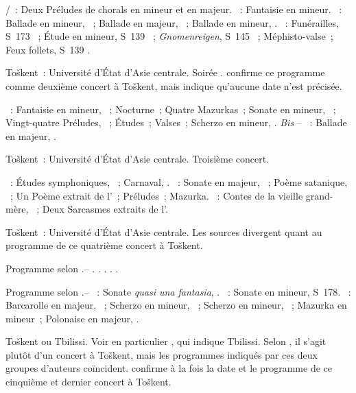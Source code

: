 \begin{description}
 \textsc{\JBach{}/\Busoni{}}~: Deux Préludes de chorals en \kG mineur et en
 \kG majeur.
 \textsc{\Mozart{}}~: Fantaisie en \kC mineur.
 \textsc{\Chopin{}}~: Ballade en \kF mineur, ~; Ballade en \kA
 \Flat majeur, ~; Ballade en \kG mineur, .
 \textsc{\Liszt{}}~: Funérailles, S~173 ~; Étude en \kF mineur,
 S~139 ~; \emph{Gnomenreigen}, S~145 ~;
 Méphisto-valse~; Feux follets, S~139 .
 \item[\DateWithWeekDay{1932-09-27}]
 Toškent~: Université d'\hbox{État} d'\hbox{Asie} centrale.
 Soirée \Chopin{}.
 \citet[p.~155]{Nekrasova08} confirme ce programme comme deuxième concert à
 Toškent, mais indique qu'aucune date n'est précisée.

 \textsc{\Chopin{}}~: Fantaisie en \kF mineur, ~; Nocturne~; Quatre
 Mazurkas~; Sonate en \kB \Flat mineur, ~; Vingt-quatre Préludes,
 ~; Études~; Valses~; Scherzo en \kB mineur, .
 \emph{Bis} -- \textsc{\Chopin{}}~: Ballade en \kA \Flat majeur, .
 \item[\DateWithWeekDay{1932-09-30}]
 Toškent~: Université d'\hbox{État} d'\hbox{Asie} centrale.
 Troisième concert.

 \textsc{\Schumann{}}~: Études symphoniques, ~; Carnaval, .
 \textsc{\Scriabine{}}~: Sonate  en \kF \Sharp majeur, ~;
 Poème satanique, ~; Un Poème extrait de l'~; Préludes~;
 Mazurka.
 \textsc{\Prokofiev{}}~: Contes de la vieille grand-mère, ~; Deux
 Sarcasmes extraits de l'.
 \item[\DateWithWeekDay{1932-10-06}]
 Toškent~: Université d'\hbox{État} d'\hbox{Asie} centrale.
 Les sources divergent quant au programme de ce quatrième concert à Toškent.

 Programme selon \citet[p.~405]{Scriabine}.--
 \textsc{\Mendelssohn{}}.
 \textsc{\Haydn{}}.
 \textsc{\Schumann{}}.
 \textsc{\Prokofiev{}}.
 \textsc{\Scriabine{}}.

 Programme selon \citet[p.~155]{Nekrasova08}.--
 \textsc{\Beethoven{}}~: Sonate \emph{quasi una fantasia}, .
 \textsc{\Liszt{}}~: Sonate en \kB mineur, S~178.
 \textsc{\Chopin{}}~: Barcarolle en \kF \Sharp majeur, ~; Scherzo
 en \kB \Flat mineur, ~; Scherzo en \kC \Sharp mineur, ~;
 Mazurka en \kC \Sharp mineur~; Polonaise en \kA \Flat majeur, .
 \item[\DateWithWeekDay{1932-10-10}]
 Toškent ou Tbilissi.
 Voir en particulier \citet[p.~427]{Milshteyn82a}, qui indique Tbilissi.
 Selon \citet[p.~405]{Scriabine}, il s'agit plutôt d'un concert à Toškent,
 mais les programmes indiqués par ces deux groupes d'auteurs coïncident.
 \citet[p.~155]{Nekrasova08} confirme à la fois la date et le programme de
 ce cinquième et dernier concert à Toškent.


\end{description}
